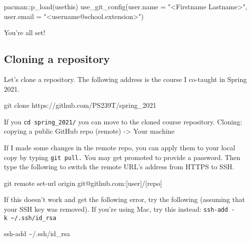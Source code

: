 \documentclass[
  letterpaper,
  DIV=11,
  numbers=noendperiod]{scrreprt}
\newenvironment{Shaded}{\begin{snugshade}}{\end{snugshade}}
\newcommand{\AttributeTok}[1]{\textcolor[rgb]{0.40,0.45,0.13}{#1}}
\newcommand{\FunctionTok}[1]{\textcolor[rgb]{0.28,0.35,0.67}{#1}}
\newcommand{\NormalTok}[1]{\textcolor[rgb]{0.00,0.23,0.31}{#1}}
\newcommand{\SpecialCharTok}[1]{\textcolor[rgb]{0.37,0.37,0.37}{#1}}
\newcommand{\StringTok}[1]{\textcolor[rgb]{0.13,0.47,0.30}{#1}}
\begin{document}
\begin{Shaded}
\begin{Highlighting}[]
\NormalTok{pacman}\SpecialCharTok{::}\FunctionTok{p\_load}\NormalTok{(usethis)}
\FunctionTok{use\_git\_config}\NormalTok{(}\AttributeTok{user.name =} \StringTok{"\textless{}Firstname Lastname\textgreater{}"}\NormalTok{,}
               \AttributeTok{user.email =} \StringTok{"\textless{}username@school.extension\textgreater{}"}\NormalTok{)}
\end{Highlighting}
\end{Shaded}

You're all set!

\hypertarget{cloning-a-repository}{%
\subsection*{Cloning a repository}\label{cloning-a-repository}}

Let's clone a repository. The following address is the course I
co-taught in Spring 2021.

\begin{Shaded}
\begin{Highlighting}[]
\FunctionTok{git}\NormalTok{ clone https://github.com/PS239T/spring\_2021}
\end{Highlighting}
\end{Shaded}

If you \texttt{cd\ spring\_2021/} you can move to the cloned course
repository. Cloning: copying a public GitHub repo (remote)
-\textgreater{} Your machine

If I made some changes in the remote repo, you can apply them to your
local copy by typing \texttt{git\ pull.} You may get promoted to provide
a password. Then type the following to switch the remote URL's address
from HTTPS to SSH.

\begin{Shaded}
\begin{Highlighting}[]
\FunctionTok{git}\NormalTok{ remote set{-}url origin git@github.com:[user]/[repo]}
\end{Highlighting}
\end{Shaded}

If this doesn't work and get the following error, try the following
(assuming that your SSH key was removed). If you're using Mac, try this
instead: \texttt{ssh-add\ -k\ \textasciitilde{}/.ssh/id\_rsa}

\begin{Shaded}
\begin{Highlighting}[]
\FunctionTok{ssh{-}add}\NormalTok{ \textasciitilde{}/.ssh/id\_rsa}
\end{Highlighting}
\end{Shaded}
\end{document}
